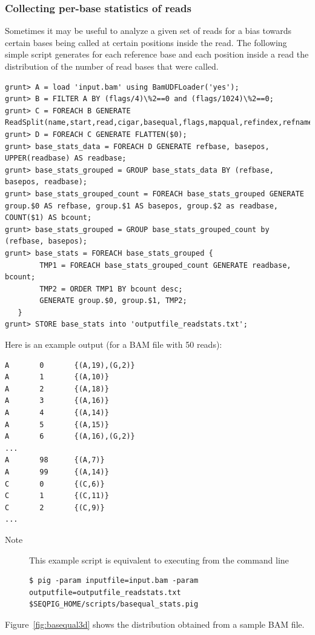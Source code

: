 \subsubsection{Collecting per-base statistics of reads}
Sometimes it may be useful to analyze a given set of reads for a bias
towards certain bases being called at certain positions inside the
read. The following simple script generates for each reference base and
each position inside a read the distribution of the number of read bases
that were called.
\begin{lstlisting}
grunt> A = load 'input.bam' using BamUDFLoader('yes');
grunt> B = FILTER A BY (flags/4)\%2==0 and (flags/1024)\%2==0;
grunt> C = FOREACH B GENERATE ReadSplit(name,start,read,cigar,basequal,flags,mapqual,refindex,refname,attributes#'MD');
grunt> D = FOREACH C GENERATE FLATTEN($0);
grunt> base_stats_data = FOREACH D GENERATE refbase, basepos, UPPER(readbase) AS readbase;
grunt> base_stats_grouped = GROUP base_stats_data BY (refbase, basepos, readbase);
grunt> base_stats_grouped_count = FOREACH base_stats_grouped GENERATE group.$0 AS refbase, group.$1 AS basepos, group.$2 as readbase, COUNT($1) AS bcount;
grunt> base_stats_grouped = GROUP base_stats_grouped_count by (refbase, basepos);
grunt> base_stats = FOREACH base_stats_grouped {
        TMP1 = FOREACH base_stats_grouped_count GENERATE readbase, bcount;
        TMP2 = ORDER TMP1 BY bcount desc;
        GENERATE group.$0, group.$1, TMP2;
   }
grunt> STORE base_stats into 'outputfile_readstats.txt';
\end{lstlisting}
Here is an example output (for a BAM file with 50 reads):
\begin{lstlisting}
A       0       {(A,19),(G,2)}
A       1       {(A,10)}
A       2       {(A,18)}
A       3       {(A,16)}
A       4       {(A,14)}
A       5       {(A,15)}
A       6       {(A,16),(G,2)}
...
A       98      {(A,7)}
A       99      {(A,14)}
C       0       {(C,6)}
C       1       {(C,11)}
C       2       {(C,9)}
...
\end{lstlisting}
\begin{description}
	\item[Note] This example script is equivalent to executing from the command line
\begin{lstlisting}
$ pig -param inputfile=input.bam -param outputfile=outputfile_readstats.txt $SEQPIG_HOME/scripts/basequal_stats.pig
\end{lstlisting}
\end{description}
Figure~\ref{fig:basequal3d} shows the distribution obtained from a sample BAM file.

